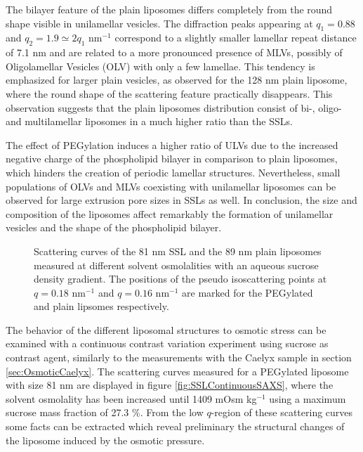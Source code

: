 The bilayer feature of the plain liposomes differs completely from the round shape visible in unilamellar vesicles. The diffraction peaks appearing at $q_1=0.88$ and $q_2=1.9\simeq2q_1$ nm$^{-1}$ correspond to a slightly smaller lamellar repeat distance of 7.1 nm and are related to a more pronounced presence of MLVs, possibly of Oligolamellar Vesicles (OLV) with only a few lamellae. This tendency is emphasized for larger plain vesicles, as observed for the 128 nm plain liposome, where the round shape of the scattering feature practically disappears. This observation suggests that the plain liposomes distribution consist of bi-, oligo- and multilamellar liposomes in a much higher ratio than the SSLs.

The effect of PEGylation induces a higher ratio of ULVs due to the increased negative charge of the phospholipid bilayer in comparison to plain liposomes, which hinders the creation of periodic lamellar structures. Nevertheless, small populations of OLVs and MLVs coexisting with unilamellar liposomes can be observed for large extrusion pore sizes in SSLs as well. In conclusion, the size and composition of the liposomes affect remarkably the formation of unilamellar vesicles and the shape of the phospholipid bilayer.

\begin{figure}
	\centering
		\subfloat[SSL 81 nm]{\resizebox{0.44\linewidth}{!}{}\label{fig:SSLContinuousSAXS}}
		\subfloat[Plain 89 nm]{\resizebox{0.44\linewidth}{!}{}\label{fig:PlainLiposomeContinuousSAXS}}
		\caption[Scattering curves of liposomes measured at different solvent osmolalities.]{Scattering curves of the 81 nm SSL and the 89 nm plain liposomes measured at different solvent osmolalities with an aqueous sucrose density gradient. The positions of the pseudo isoscattering points at $q=0.18$ nm$^{-1}$ and $q=0.16$ nm$^{-1}$ are marked for the PEGylated and plain lipsomes respectively.}
\end{figure}

The behavior of the different liposomal structures to osmotic stress can be examined with a continuous contrast variation experiment using sucrose as contrast agent, similarly to the measurements with the Caelyx sample in section \ref{sec:OsmoticCaelyx}. The scattering curves measured for a PEGylated liposome with size 81 nm are displayed in figure \ref{fig:SSLContinuousSAXS}, where the solvent osmolality has been increased until 1409 mOsm kg$^{-1}$ using a maximum sucrose mass fraction of 27.3 $\%$. From the low $q$-region of these scattering curves some facts can be extracted which reveal preliminary the structural changes of the liposome induced by the osmotic pressure.

